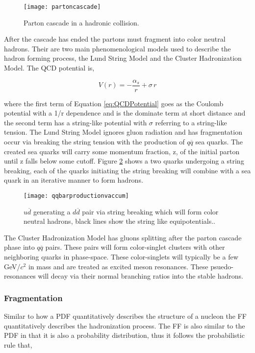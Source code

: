 \begin{figure}[h]
\texttt{[image: partoncascade]}
\centering
\caption{Parton cascade in a hadronic collision\cite{Webber:1994zd}.}
\label{fig:pcascade}
\end{figure}

\noindent
After the cascade has ended the partons must fragment into color neutral hadrons.  Their are two main phenomenological models used to describe the hadron forming process, the Lund String Model and the Cluster Hadronization Model.  The QCD potential is,

\begin{equation}
V(r) = - \frac{\alpha_{s}}{r} + \sigma \, r
\label{eq:QCDPotential}
\end{equation}

\noindent
where the first term of Equation \ref{eq:QCDPotential} goes as the Coulomb potential with a 1/r dependence and is the dominate term at short distance and the second term has a string-like potential with $\sigma$ referring to a string-like tension.  The Lund String Model ignores gluon radiation and has fragmentation occur via breaking the string tension with the production of $q\overline{q}$ sea quarks.  The created sea quarks will carry some momentum fraction, z, of the initial parton until z falls below some cutoff.  Figure \ref{fig:qqbarstring} shows a two quarks undergoing a string breaking, each of the quarks initiating the string breaking will combine with a sea quark in an iterative manner to form hadrons.  


\begin{figure}[h]
\texttt{[image: qqbarproductionvaccum]}
\centering
\caption{$u \overline{d}$ generating a $d \overline{d}$ pair via string breaking which will form color neutral hadrons, black lines show the string like equipotentials.\cite{Andersson:2002ap}.}
\label{fig:qqbarstring}
\end{figure}

The Cluster Hadronization Model has gluons splitting after the parton cascade phase into $q\overline{q}$ pairs.  These pairs will form color-singlet clusters with other neighboring quarks in phase-space.  These color-singlets will typically be a few GeV/\textit{$c^{2}$} in mass and are treated as excited meson resonances.  These psuedo-resonances will decay via their normal branching ratios into the stable hadrons\cite{Webber:1983if}.


\subsubsection{Fragmentation}
Similar to how a PDF quantitatively describes the structure of a nucleon the FF quantitatively describes the hadronization process.  The FF is also similar to the PDF in that it is also a probability distribution, thus it follows the probabilistic rule that,

